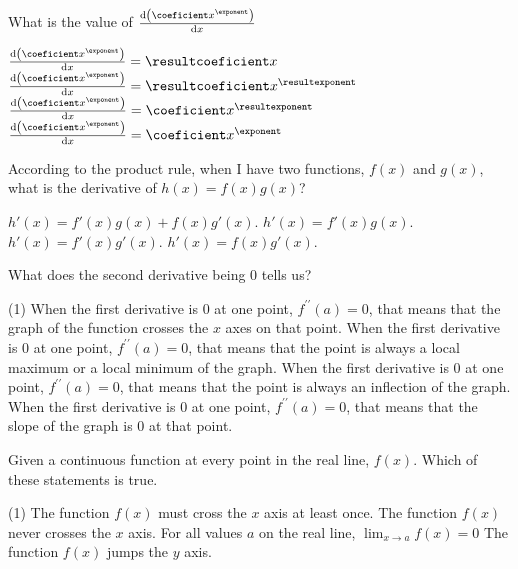 \documentclass[12pt, noquestionbreak, flushbottom, customfontpath=../Fonts/]{../skrexam}  %
\begin{document}
\begin{questions}

\question 
	\pgfmathtruncatemacro{\resultcoeficient}{\coeficient*\exponent}
	What is the value of $\dv{\qty(\coeficient x^{\exponent})}{x}$
	\begin{choices}
		\choice $\dv{\qty(\coeficient x^{\exponent})}{x} = \resultcoeficient x$
		\choice\CorrectChoice $\dv{\qty(\coeficient x^{\exponent})}{x} = \resultcoeficient x^{\resultexponent}$
		\choice $\dv{\qty(\coeficient x^{\exponent})}{x} = \coeficient x^{\resultexponent}$
		\choice $\dv{\qty(\coeficient x^{\exponent})}{x} = \coeficient x^{\exponent}$
	\end{choices}

	\question According to the product rule, when I have two functions, $f(x)$ and $g(x)$, what is the derivative of $h(x) = f(x) g(x)$?
	\begin{choices}
		\choice\CorrectChoice $h'(x) = f'(x) g(x)+ f(x) g '(x)$.
		\choice $h'(x) = f'(x) g(x)$.
		\choice $h'(x) = f'(x) g '(x)$.
		\choice $h'(x) = f(x) g '(x)$.
	\end{choices}


	\question What does the second derivative being 0 tells us?
	\begin{choices}(1)
		\choice When the first derivative is $0$ at one point, $f^{\prime \prime}(a) = 0$, that means that the graph of the function crosses the $x$ axes on that point.
		\choice When the first derivative is $0$ at one point, $f^{\prime \prime}(a) = 0$, that means that the point is always a local maximum or a local minimum of the graph.
		\choice\CorrectChoice When the first derivative is $0$ at one point, $f^{\prime \prime}(a) = 0$, that means that the point is always an inflection of the graph.
		\choice When the first derivative is $0$ at one point, $f^{\prime \prime}(a) = 0$, that means that the slope of the graph is $0$ at that point.
	\end{choices}

	\question Given a continuous function at every point in the real line, $f(x)$. Which of these statements is true. 
	\begin{choices}(1)
		\choice The function $f(x)$ must cross the $x$ axis at least once.
		\choice The function $f(x)$ never crosses the $x$ axis.
		\choice\CorrectChoice For all values $a$ on the real line, $ \lim_{x \to a}f(x)  = 0$
		\choice The function $f(x)$ jumps the $y$ axis.
	\end{choices}
	


\end{questions}
\end{document}
